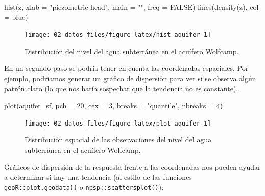 \documentclass[
  spanish,
]{book}
\newenvironment{Shaded}{\begin{snugshade}}{\end{snugshade}}
\newcommand{\AttributeTok}[1]{\textcolor[rgb]{0.77,0.63,0.00}{#1}}
\newcommand{\ConstantTok}[1]{\textcolor[rgb]{0.00,0.00,0.00}{#1}}
\newcommand{\DecValTok}[1]{\textcolor[rgb]{0.00,0.00,0.81}{#1}}
\newcommand{\FunctionTok}[1]{\textcolor[rgb]{0.00,0.00,0.00}{#1}}
\newcommand{\NormalTok}[1]{#1}
\newcommand{\StringTok}[1]{\textcolor[rgb]{0.31,0.60,0.02}{#1}}
\theoremstyle{break}
\begin{document}
\begin{Shaded}
\begin{Highlighting}[]
\FunctionTok{hist}\NormalTok{(z, }\AttributeTok{xlab =} \StringTok{"piezometric{-}head"}\NormalTok{, }\AttributeTok{main =} \StringTok{""}\NormalTok{, }\AttributeTok{freq =} \ConstantTok{FALSE}\NormalTok{)}
\FunctionTok{lines}\NormalTok{(}\FunctionTok{density}\NormalTok{(z), }\AttributeTok{col =} \StringTok{\textquotesingle{}blue\textquotesingle{}}\NormalTok{)}
\end{Highlighting}
\end{Shaded}

\begin{figure}[!htb]

{\centering \texttt{[image: 02-datos\_files/figure-latex/hist-aquifer-1]} 

}

\caption{Distribución del nivel del agua subterránea en el acuífero Wolfcamp.}\label{fig:hist-aquifer}
\end{figure}

En un segundo paso se podría tener en cuenta las coordenadas espaciales.
Por ejemplo, podríamos generar un gráfico de dispersión para ver si se observa
algún patrón claro (lo que nos haría sospechar que la tendencia no es constante).

\begin{Shaded}
\begin{Highlighting}[]
\FunctionTok{plot}\NormalTok{(aquifer\_sf, }\AttributeTok{pch =} \DecValTok{20}\NormalTok{, }\AttributeTok{cex =} \DecValTok{3}\NormalTok{, }\AttributeTok{breaks =} \StringTok{"quantile"}\NormalTok{, }\AttributeTok{nbreaks =} \DecValTok{4}\NormalTok{)}
\end{Highlighting}
\end{Shaded}

\begin{figure}[!htb]

{\centering \texttt{[image: 02-datos\_files/figure-latex/plot-aquifer-1]} 

}

\caption{Distribución espacial de las observaciones del nivel del agua subterránea en el acuífero Wolfcamp.}\label{fig:plot-aquifer}
\end{figure}

Gráficos de dispersión de la respuesta frente a las coordenadas nos pueden ayudar a determinar si hay una tendencia (al estilo de las funciones \texttt{geoR::plot.geodata()} o \texttt{npsp::scattersplot()}):
\end{document}

